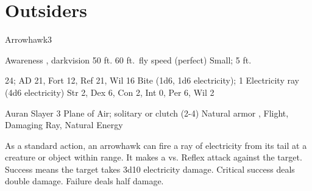 \section{Outsiders}

    \begin{monsection}{Arrowhawk}{3}
        \begin{spellcontent}
            \begin{spelltargetinginfo}
                \pari {} Awareness , darkvision 50 ft.
                \pari {} 60 ft.\ fly speed (perfect)
                \pari {} Small;  5 ft.
            \end{spelltargetinginfo}
            \begin{spelleffects}
                \pari {} 24;  AD 21, Fort 12, Ref 21, Wil 16
                \pari {} Bite  (1d6, 1d6 electricity);  1
                \pari {} Electricity ray  (4d6 electricity)
                \pari {} Str 2, Dex 6, Con 2, Int 0, Per 6, Wil 2
            \end{spelleffects}
        \end{spellcontent}
        \begin{spellfooter}
            \pari {} Auran
            \pari {} Slayer 3
            \pari {} Plane of Air; solitary or clutch (2-4)
            \pari {} Natural armor , Flight, Damaging Ray, Natural Energy
        \end{spellfooter}
    \end{monsection}

     As a standard action, an arrowhawk can fire a ray of electricity from its tail at a creature or object within \rngmed range.
    It makes a  vs. Reflex attack against the target.
    Success means the target takes 3d10 electricity damage.
    Critical success deals double damage.
    Failure deals half damage.

